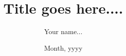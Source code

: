\iffalse
    Title page
    Copyright (c) 2025 Fang Zeyuan (@veslrs)

    Usage: in document scope, for documentclass=article, do: `\printcover`
                              for documentclass=book, do under \frontmatter: `\printcover`
\fi

\title{Title goes here....}
\author{Your name...}
\date{Month, yyyy}

\makeatletter
\newcommand{\printcover}{%
    \begin{titlepage}
        \begin{center}
            \normalsize
            \vspace{\stretch{1}}
            
            {\bfseries \@title}
            
            \vspace{\stretch{1}}
            Submitted in partial fulfilment of the requirements for the\\
            degree of Master of Science in Engineering \\[1em]
            to\\[1em]  
            DTU Sustain
            
            \vspace{\stretch{1}}            
            \@author            
            \vspace{\stretch{2}}
            
            Technical University of Denmark
            
            2800 Kgs. Lyngby
            
            \vspace{2em}
            
            \@date
            \vspace{\stretch{1}}
        \end{center}
        
    \end{titlepage}
}
\makeatother
